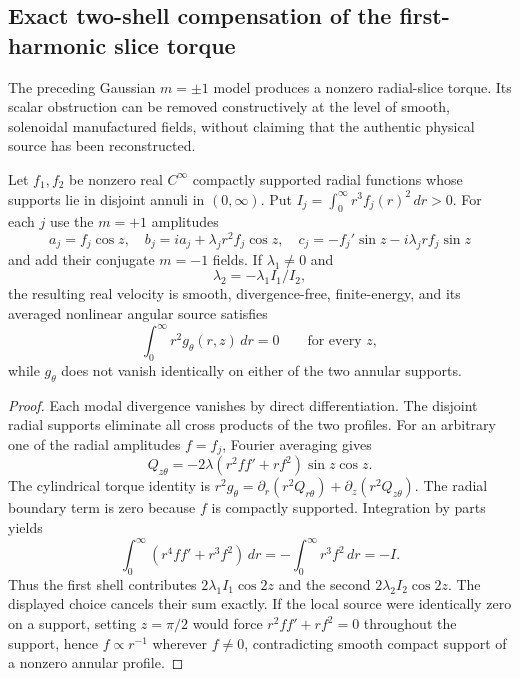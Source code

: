 
\subsection{Exact two-shell compensation of the first-harmonic slice torque}
\label{subsec:nonaxis-two-shell-XXIII}
The preceding Gaussian $m=\pm1$ model produces a nonzero radial-slice
torque. Its scalar obstruction can be removed constructively at the
level of smooth, solenoidal manufactured fields, without claiming
that the authentic physical source has been reconstructed.

\begin{proposition}
\label{prop:two-shell-XXIII}
Let $f_1,f_2$ be nonzero real $C^\infty$ compactly supported
radial functions whose supports lie in disjoint annuli in $(0,\infty)$.
Put $I_j=\int_0^\infty r^3f_j(r)^2\,dr>0$.
For each $j$ use the $m=+1$ amplitudes
\[
a_j=f_j\cos z,\quad
b_j=ia_j+\lambda_j r^2f_j\cos z,\quad
c_j=-f_j'\sin z-i\lambda_j rf_j\sin z
\]
and add their conjugate $m=-1$ fields.
If $\lambda_1\ne0$ and
\[
\boxed{\lambda_2=-\lambda_1 I_1/I_2},
\]
the resulting real velocity is smooth, divergence-free, finite-energy,
and its averaged nonlinear angular source satisfies
\[
\boxed{\int_0^\infty r^2g_\theta(r,z)\,dr=0}
\qquad\text{for every }z,
\]
while $g_\theta$ does not vanish identically on either of the two
annular supports.
\end{proposition}
\begin{proof}
Each modal divergence vanishes by direct differentiation.
The disjoint radial supports eliminate all cross products of
the two profiles. For an arbitrary one of the radial amplitudes
$f=f_j$, Fourier averaging gives
\[
Q_{z\theta}
=-2\lambda(r^2ff'+rf^2)\sin z\cos z.
\]
The cylindrical torque identity is
$r^2g_\theta=\partial_r(r^2Q_{r\theta})
+\partial_z(r^2Q_{z\theta})$.
The radial boundary term is zero because $f$ is compactly supported.
Integration by parts yields
\[
\int_0^\infty (r^4ff'+r^3f^2)\,dr
=-\int_0^\infty r^3f^2\,dr=-I.
\]
Thus the first shell contributes $2\lambda_1I_1\cos2z$
and the second $2\lambda_2I_2\cos2z$.
The displayed choice cancels their sum exactly.
If the local source were identically zero on a support, setting
$z=\pi/2$ would force $r^2ff'+rf^2=0$ throughout the
support, hence $f\propto r^{-1}$ wherever $f\ne0$,
contradicting smooth compact support of a nonzero annular profile.
\end{proof}

